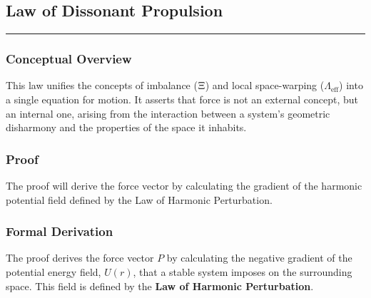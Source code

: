 
\subsection*{Law of Dissonant Propulsion}
\hrule
\vspace{0.3cm}
\vspace{0.5cm}

\subsubsection*{Conceptual Overview}
This law unifies the concepts of imbalance ($\Xi$) and local space-warping ($\Lambda_{\text{eff}}$) into a single equation for motion.  It asserts that force is not an external concept, but an internal one, arising from the interaction between a system's geometric disharmony and the properties of the space it inhabits. 

\subsubsection*{Proof}
The proof will derive the force vector by calculating the gradient of the harmonic potential field defined by the Law of Harmonic Perturbation. 

\subsubsection*{Formal Derivation}
The proof derives the force vector $P$ by calculating the negative gradient of the potential energy field, $U(r)$, that a stable system imposes on the surrounding space. This field is defined by the \textbf{Law of Harmonic Perturbation}. 

